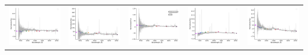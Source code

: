 \begin{center}
\begin{longtable}{l l l l l }
    \includegraphics[width=0.19\linewidth, clip]{Figs/Figs-lamost/spec-55915-F5591503_sp12-098-STRIPE82-0063-036294.pdf} & \includegraphics[width=0.19\linewidth, clip]{Figs/Figs-lamost/spec-55915-F5591503_sp13-115-STRIPE82-0065-022216.pdf} & \includegraphics[width=0.19\linewidth, clip]{Figs/Figs-lamost/spec-55916-F5591602_sp01-125-STRIPE82-0042-018967.pdf} & \includegraphics[width=0.19\linewidth, clip]{Figs/Figs-lamost/spec-55916-F5591602_sp02-136-STRIPE82-0040-030039.pdf} & \includegraphics[width=0.19\linewidth, clip]{Figs/Figs-lamost/spec-55920-F5592001_sp09-085-STRIPE82-0032-003020.pdf} \\

\end{longtable}
\end{center}
